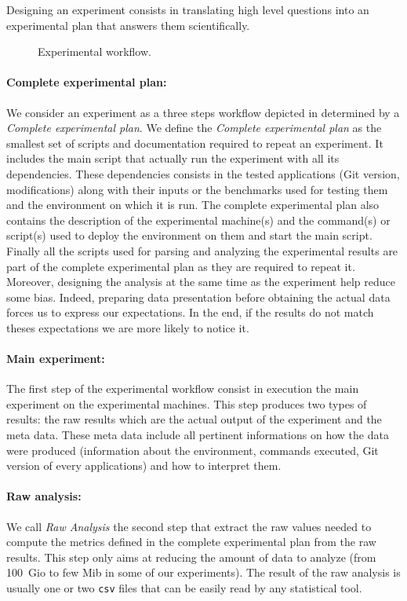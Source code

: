 Designing an experiment consists in translating high level questions into an experimental plan that answers them scientifically.

\begin{figure}[htb]
    \centering
    
    \caption{Experimental workflow.}
    \label{fig:exp-pipeline}
\end{figure}

\paragraph{Complete experimental plan:}
We consider an experiment as a three steps workflow depicted in  determined by a \emph{Complete experimental plan}.
We define the \emph{Complete experimental plan} as the smallest set of scripts and documentation required to repeat an experiment.
It includes the main script that actually run the experiment with all its dependencies.
These dependencies consists in the tested applications (\gls{Git} version, modifications) along with their inputs or the benchmarks used for testing them and the environment on which it is run.
The complete experimental plan also contains the description of the experimental machine(s) and the command(s) or script(s) used to deploy the environment on them and start the main script.
Finally all the scripts used for parsing and analyzing the experimental results are part of the complete experimental plan as they are required to repeat it.
Moreover, designing the analysis at the same time as the experiment help reduce some bias.
Indeed, preparing data presentation before obtaining the actual data forces us to express our expectations.
In the end, if the results do not match theses expectations we are more likely to notice it.

\paragraph{Main experiment:}
The first step of the experimental workflow consist in execution the main experiment on the experimental machines.
This step produces two types of results: the raw results which are the actual output of the experiment and the meta data.
These meta data include all pertinent informations on how the data were produced (information about the environment, commands executed, \gls{Git} version of every applications) and how to interpret them.

\paragraph{Raw analysis:}
We call \emph{Raw Analysis} the second step that extract the raw values needed to compute the metrics defined in the complete experimental plan from the raw results.
This step only aims at reducing the amount of data to analyze (from \SI{100}{Gio} to few Mib in some of our experiments).
The result of the raw analysis is usually one or two \texttt{csv} files that can be easily read by any statistical tool.

